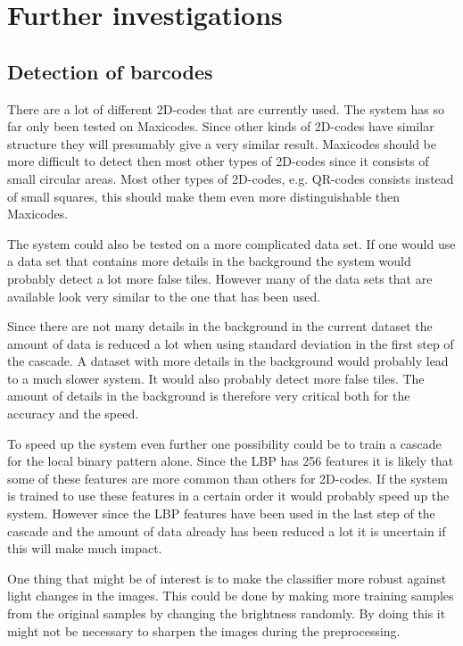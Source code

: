 \chapter{Further investigations}
\label{sec:Further investigations}

\section{Detection of barcodes}
\label{sec:Detection of barcodes}
There are a lot of different 2D-codes that are currently used. The system has so far only been tested on Maxicodes. Since other kinds of 2D-codes have similar structure they will presumably give a very similar result. Maxicodes should be more difficult to detect then most other types of 2D-codes since it consists of small circular areas. Most other types of 2D-codes, e.g. QR-codes consists instead of small squares, this should make them even more distinguishable then Maxicodes.

The system could also be tested on a more complicated data set. If one would use a data set that contains more details in the background the system would probably detect a lot more false tiles. However many of the data sets that are available look very similar to the one that has been used.

Since there are not many details in the background in the current dataset the amount of data is reduced a lot when using standard deviation in the first step of the cascade. A dataset with more details in the background would probably lead to a much slower system. It would also probably detect more false tiles. The amount of details in the background is therefore very critical both for the accuracy and the speed.

To speed up the system even further one possibility could be to train a cascade for the local binary pattern alone. Since the LBP has 256 features it is likely that some of these features are more common than others for 2D-codes. If the system is trained to use these features in a certain order it would probably speed up the system. However since the LBP features have been used in the last step of the cascade and the amount of data already has been reduced a lot it is uncertain if this will make much impact.

One thing that might be of interest is to make the classifier more robust against light changes in the images. This could be done by making more training samples from the original samples by changing the brightness randomly. By doing this it might not be necessary to sharpen the images during the preprocessing.

